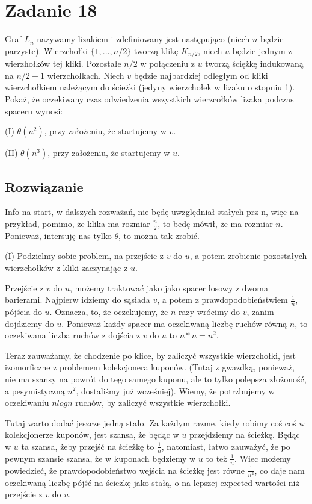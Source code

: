 \section{Zadanie 18}
Graf \(L_n\) nazywamy lizakiem i zdefiniowany jest następująco (niech \(n\) będzie parzyste). Wierzchołki \(\{1, ... , n/2\}\) tworzą klikę \(K_{n/2}\), niech \(u\) będzie jednym z wierzhołków tej kliki. Pozostałe \(n/2\) w połączeniu z \(u\) tworzą ściężkę indukowaną na \(n/2+1\) wierzchołkach. Niech \(v\) będzie najbardziej odległym od kliki wierzchołkiem należącym do ścieżki (jedyny wierzchołek w lizaku o stopniu 1). Pokaż, że oczekiwany czas odwiedzenia wszystkich wierzcołków lizaka podczas spaceru wynosi:

(I) \(\theta (n^2)\), przy założeniu, że startujemy w \(v\).

(II) \(\theta (n^3)\), przy założeniu, że startujemy w \(u\).

\subsection*{Rozwiązanie}

Info na start, w dalszych rozważań, nie będę uwzględniał stałych prz n, więc na przykład, pomimo, że klika ma rozmiar \(\frac{n}{2}\), to bedę mówił, że ma rozmiar \(n\). Ponieważ, intersuję nas tylko \(\theta\), to można tak zrobić.

(I) Podzielmy sobie problem, na przejście z \(v\) do \(u\), a potem zrobienie pozostałych wierzchołków z kliki zaczynając z \(u\).

Przejście z \(v\) do \(u\), możemy traktować jako jako spacer losowy z dwoma barierami. Najpierw idziemy do sąsiada \(v\), a potem z prawdopodobieństwiem \(\frac{1}{n}\), pójścia do \(u\). Oznacza, to, że oczekujemy, że \(n\) razy wrócimy do \(v\), zanim dojdziemy do \(u\). Ponieważ każdy spacer ma oczekiwaną liczbę ruchów równą \(n\), to oczekiwana liczba ruchów z dojścia z \(v\) do \(u\) to \(n * n = n^2\).

Teraz zauważamy, że chodzenie po klice, by zaliczyć wszystkie wierzchołki, jest izomorficzne z problemem kolekcjonera kuponów. (Tutaj z gwazdką, ponieważ, nie ma szansy na powrót do tego samego kuponu, ale to tylko polepsza złożoność, a pesymistyczną \(n^2\), dostaliśmy już wcześniej). Wiemy, że potrzbujemy w oczekiwaniu \(n log n\) ruchów, by zaliczyć wszystkie wierzchołki.

Tutaj warto dodać jeszcze jedną stało. Za każdym razme, kiedy robimy coś coś w kolekcjonerze kuponów, jest szansa, że będąc w \(u\) przejdziemy na ścieżkę. Będąc w \(u\) ta szansa, żeby przejść na ścieżkę to \(\frac{1}{n}\), natomiast, łatwo zauważyć, że po pewnym szansie szansa, że w kuponach będziemy w \(u\) to też \(\frac{1}{n}\). Wiec możemy powiedzieć, że prawdopodobieństwo wejścia na ścieżkę  jest równe \(\frac{1}{n^2}\), co daje nam oczekiwaną liczbę pójść na ścieżkę jako stałą, o na lepszej expected wartości niż przejście z \(v\) do \(u\).

